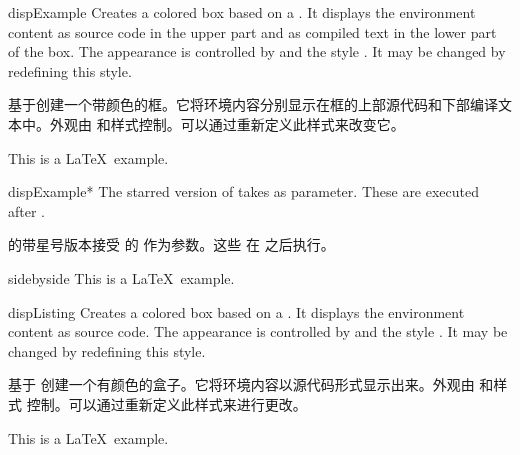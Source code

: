 {\let\xdispExample\dispExample
\let\endxdispExample\enddispExample
\begin{docEnvironment}[doc updated=2014-10-10]{dispExample}{}
Creates a colored box based on a .
It displays the environment content as source code in the upper part
and as compiled text in the lower part of the box.
The appearance is controlled by 
and the style . It may be
changed by redefining this style.

基于创建一个带颜色的框。它将环境内容分别显示在框的上部源代码和下部编译文本中。外观由 和样式控制。可以通过重新定义此样式来改变它。
{
\begin{xdispExample}
\begin{dispExample}
This is a \LaTeX\ example.
\end{dispExample}
\end{xdispExample}
}
\end{docEnvironment}}


{\let\xdispExample\dispExample
\let\endxdispExample\enddispExample
\begin{docEnvironment}[doc updated=2014-10-10]{dispExample*}{}
The starred version of  takes  
as parameter. These  are executed after .

 的带星号版本接受  的  作为参数。这些  在  之后执行。
\begin{xdispExample}
\begin{dispExample*}{sidebyside}
This is a \LaTeX\ example.
\end{dispExample*}
\end{xdispExample}
\end{docEnvironment}}


\begin{docEnvironment}{dispListing}{}
Creates a colored box based on a .
It displays the environment content as source code.
The appearance is controlled by 
and the style . It may be
changed by redefining this style.

基于  创建一个有颜色的盒子。它将环境内容以源代码形式显示出来。外观由  和样式  控制。可以通过重新定义此样式来进行更改。
\begin{dispExample}
\begin{dispListing}
This is a \LaTeX\ example.
\end{dispListing}
\end{dispExample}
\end{docEnvironment}


